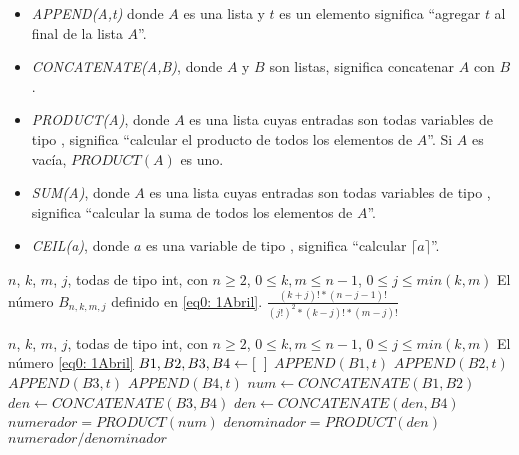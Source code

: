 \begin{itemize}
	\item \textit{APPEND(A,t)} donde $A$ es una lista y $t$ es un elemento
	significa ``agregar $t$ al final de la lista $A$''.
	\item \textit{CONCATENATE(A,B)}, donde $A$ y $B$ son listas, significa
	concatenar $A$ con $B$.
	\item \textit{PRODUCT(A)}, donde $A$ es una lista cuyas entradas
	son todas variables de tipo , significa ``calcular el producto
	de todos los elementos de $A$''. Si $A$ es vacía, $PRODUCT(A)$ es uno.
	\item \textit{SUM(A)}, donde $A$ es una lista cuyas entradas
	son todas variables de tipo , significa ``calcular la suma
	de todos los elementos de $A$''. 
	\item \textit{CEIL(a)}, donde $a$ es una variable de tipo , significa
	``calcular $\lceil a \rceil$''.
\end{itemize}

\begin{algorithm}
\caption{$sumandoV1$}\label{alg: sumandoV1}
\begin{algorithmic} [1]
\REQUIRE $n$, $k$, $m$, $j$, todas de tipo int, con $n \geq 2$, 
$0 \leq k, m \leq n-1$, $0 \leq j \leq min(k,m)$
\ENSURE El número $B_{n, k, m, j}$ definido en \eqref{eq0: 1Abril}.
\RETURN $\frac{(k+j)! * (n-j-1)! }{(j!)^{2}* (k-j)! * (m-j)!}$
\end{algorithmic}
\end{algorithm}

\begin{algorithm}
\caption{$sumandoV2$}\label{alg: sumandoV2}
\begin{algorithmic} [1]
\REQUIRE $n$, $k$, $m$, $j$, todas de tipo int, con $n \geq 2$, 
$0 \leq k, m \leq n-1$, $0 \leq j \leq min(k,m)$
\ENSURE El número \eqref{eq0: 1Abril}
\STATE $B1, B2, B3, B4 \leftarrow [\hspace{0.2cm}]$
\STATE $APPEND(B1, t)$
\ENDFOR
{} 
\STATE $APPEND(B2, t)$
\ENDFOR
{} 
\STATE $APPEND(B3, t)$
\ENDFOR
{} 
\STATE $APPEND(B4, t)$
\ENDFOR
\STATE $num \leftarrow CONCATENATE(B1, B2)$
\STATE $den \leftarrow CONCATENATE(B3, B4)$
\STATE $den \leftarrow CONCATENATE(den, B4)$
\STATE $numerador = PRODUCT(num)$
\STATE $denominador = PRODUCT(den)$
\RETURN $numerador/denominador$
\end{algorithmic}
\end{algorithm}



